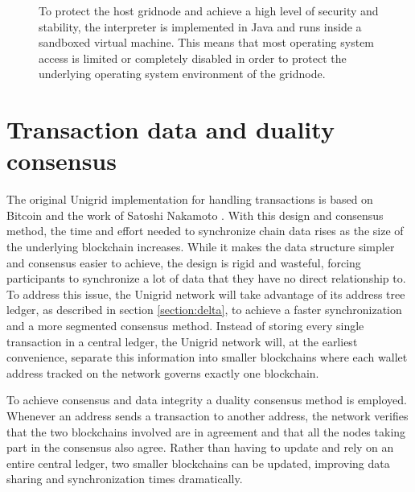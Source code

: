 \documentclass[10pt,a4paper,final]{article}
\begin{document}
\begin{figure}[H]
\centering
{}
\caption{To protect the host \gls{gridnode} and achieve a high level of security and stability, the interpreter is implemented in Java and runs inside a sandboxed virtual machine. This means that most operating system access is limited or completely disabled in order to protect the underlying operating system environment of the \gls{gridnode}.}
\end{figure}

\section{Transaction data and duality consensus}
The original Unigrid implementation for handling transactions is based on Bitcoin and the work of Satoshi Nakamoto \cite{bitcoin2008}. With this design and consensus method, the time and effort needed to synchronize chain data rises as the size of the underlying blockchain increases. While it makes the data structure simpler and consensus easier to achieve, the design is rigid and wasteful, forcing participants to synchronize a lot of data that they have no direct relationship to. To address this issue, the Unigrid network will take advantage of its address tree ledger, as described in section \ref{section:delta}, to achieve a faster synchronization and a more segmented consensus method. Instead of storing every single transaction in a central ledger, the Unigrid network will, at the earliest convenience, separate this information into smaller blockchains where each wallet address tracked on the network governs exactly one blockchain.

To achieve consensus and data integrity a duality consensus method is employed. Whenever an address sends a transaction to another address, the network verifies that the two blockchains involved are in agreement and that all the nodes taking part in the consensus also agree. Rather than having to update and rely on an entire central ledger, two smaller blockchains can be updated, improving data sharing and synchronization times dramatically.
\end{document}
